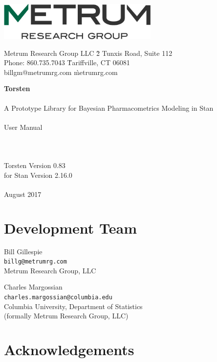 \documentclass[11pt]{amsart}
\begin{document}
\begin{center}
\includegraphics[height=0.75in]{graphics/logo.jpg}\\
\textcolor{MRGGreen}{\sf
\begin{tabbing}
Metrum Research Group LLC \` 2 Tunxis Road, Suite 112 \\
Phone: 860.735.7043 \` Tariffville, CT 06081 \\
billgm@metrumrg.com \` metrumrg.com \\
\end{tabbing}
}
{\Huge \textcolor{MRGGreen}{\textbf{Torsten}} \\ \ \\  \huge A Prototype Library for Bayesian Pharmacometrics Modeling in Stan \\ \ \\
User Manual \\ \ \\ \ \\ \ \\
\Large Torsten Version 0.83 \\ for Stan Version 2.16.0 \\ \ \\
\large August 2017 }
\end{center}

\clearpage


\tableofcontents

\pagebreak

\section*{Development Team}
Bill Gillespie \\
\texttt{billg@metrumrg.com} \\
Metrum Research Group, LLC

Charles Margossian \\
\texttt{charles.margossian@columbia.edu} \\
Columbia University, Department of Statistics \\
(formally Metrum Research Group, LLC)

\section*{Acknowledgements}
\end{document}
